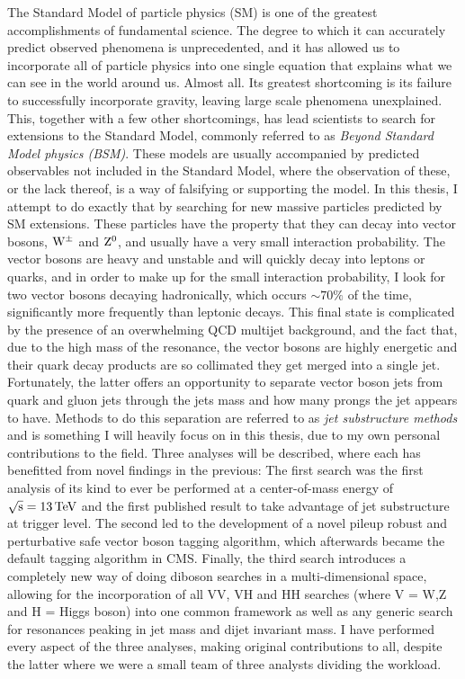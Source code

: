 \noindent The Standard Model of particle physics (SM) is one of the greatest accomplishments of fundamental science. The degree to which it can accurately predict observed phenomena is unprecedented, and it has allowed us to incorporate all of particle physics into one single equation that explains what we can see in the world around us. Almost all. Its greatest shortcoming is its failure to successfully incorporate gravity, leaving large scale phenomena unexplained. This, together with a few other shortcomings, has lead scientists to search for extensions to the Standard Model, commonly referred to as \emph{Beyond Standard Model physics (BSM)}. These models are usually accompanied by predicted observables not included in the Standard Model, where the observation of these, or the lack thereof, is a way of falsifying or supporting the model. In this thesis, I attempt to do exactly that by searching for new massive particles predicted by SM extensions. These particles have the property that they can decay into vector bosons, $\mathrm{W}^{\pm}$ and $\mathrm{Z}^{0}$, and usually have a very small interaction probability. The vector bosons are heavy and unstable and will quickly decay into leptons or quarks, and in order to make up for the small interaction probability, I look for two vector bosons decaying hadronically, which occurs $\sim70\%$ of the time, significantly more frequently than leptonic decays. This final state is complicated by the presence of an overwhelming QCD multijet background, and the fact that, due to the high mass of the resonance, the vector bosons are highly energetic and their quark decay products are so collimated they get merged into a single jet. Fortunately, the latter offers an opportunity to separate vector boson jets from quark and gluon jets through the jets mass and how many prongs the jet appears to have. Methods to do this separation are referred to as \emph{jet substructure methods} and is something I will heavily focus on in this thesis, due to my own personal contributions to the field.
\newline
\newline
Three analyses will be described, where each has benefitted from novel findings in the previous: The first search was the first analysis of its kind to ever be performed at a center-of-mass energy of $\sqrt{\rm{s}}=13 \,\text{Te\hspace{-.08em}V}$ and the first published result to take advantage of jet substructure at trigger level. The second led to the development of a novel pileup robust and perturbative safe vector boson tagging algorithm, which afterwards became the default tagging algorithm in CMS. Finally, the third search introduces a completely new way of doing diboson searches in a multi-dimensional space, allowing for the incorporation of all VV, VH and HH searches (where V = W,Z and H = Higgs boson) into one common framework as well as any generic search for resonances peaking in jet mass and dijet invariant mass. I have performed every aspect of the three analyses, making original contributions to all, despite the latter where we were a small team of three analysts dividing the workload.
